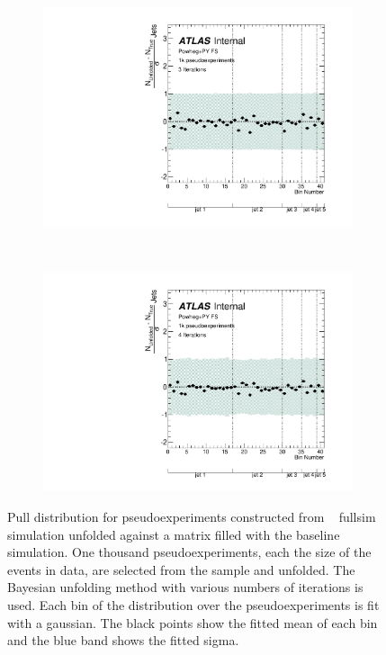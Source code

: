 \begin{figure}
\begin{subfigure}[]{0.5\textwidth}
\includegraphics[width=\textwidth]{fig/Stress/117050fullsim/Pull3Iterations.pdf}
\end{subfigure}
~
\begin{subfigure}[]{0.5\textwidth}
\includegraphics[width=\textwidth]{fig/Stress/117050fullsim/Pull4Iterations.pdf}
\end{subfigure}
\caption{Pull distribution for pseudoexperiments constructed from \newline \powpy~ fullsim simulation unfolded against a matrix filled with the baseline simulation. One thousand pseudoexperiments, each the size of the events in data, are selected from the sample and unfolded. The Bayesian unfolding method with various numbers of iterations is used. Each bin of the distribution over the pseudoexperiments is fit with a gaussian. The black points show the fitted mean of each bin and the blue band shows the fitted sigma.}
\label{fig:fspull}
\end{figure}
